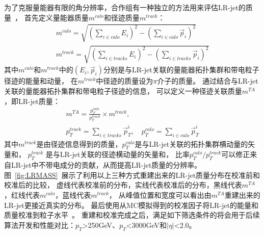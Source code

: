 为了克服量能器有限的角分辨率，合作组有一种独立的方法用来评估LR-jet的质量~\cite{TAGGING5}，
首先定义量能器质量$m^{calo}$和径迹质量$m^{track}$：
\begin{equation} 
\label{eq:LRMASS1}
 \begin{aligned}
  m^{calo}=\sqrt{(\sum_{i\in  calo} E_i )^2-(\sum_{i\in calo} \vec{p}_i)^2}
  \\
  m^{track}=\sqrt{(\sum_{i\in tracks} E_i )^2-(\sum_{i\in tracks} \vec{p}_i)^2}
 \end{aligned}
\end{equation}
其中$m^{calo}$和$m^{track}$中的$(E_i,\vec{p}_i)$分别是与LR-jet关联的量能器拓扑集群和带电粒子径迹的能量和动量，
在$m^{track}$中径迹的质量设为$\pi$介子的质量。
通过结合与LR-jet关联的量能器拓扑集群和带电粒子径迹的信息，
可以定义一种径迹关联质量$m^{TA}$，即LR-jet质量：
\begin{equation} 
\label{eq:LRMASS2}
 \begin{aligned}
m^{TA}=\frac{p_{T}^{calo}}{p_{T}^{track}} \times m^{track},
\\
p_{T}^{track}=\sum_{i\in tracks} \vec{p}_T^i, \quad p_{T}^{calo}=\sum_{i\in calo} \vec{p}_T^i
 \end{aligned}
\end{equation}
其中$m^{track}$是由径迹信息得到的质量，$p_{T}^{calo}$是与LR-jet关联的拓扑集群横动量的矢量和，
$p_{T}^{track}$ 是与LR-jet关联的径迹横动量的矢量和，
比率$p_{T}^{calo}/p_{T}^{track}$可以修正来自LR-jet中不带电成分的贡献，从而提高LR-jet质量的分辨率。
图~\ref{fig:LRMASS}~展示了利用以上三种方式重建出来的LR-jet质量分布在校准前和校准后的比较，
虚线代表校准前的分布，实线代表校准后的分布，黑线代表$m^{TA}$，红线代表$m^{calo}$，蓝线代表$m^{track}$，
从峰值位置和宽度可以看出由$m^{TA}$重建出来的LR-jet更接近真实的分布。
最后使用从MC模拟得到的校准因子将LR-jet的能量和质量校准到粒子水平~\cite{JETM-2018-02}。
重建和校准完成之后，满足如下筛选条件的将会用于后续算法开发和性能对比：$p_{T}$>250GeV、$p_{T}$<3000GeV和$|\eta|$<2.0。


